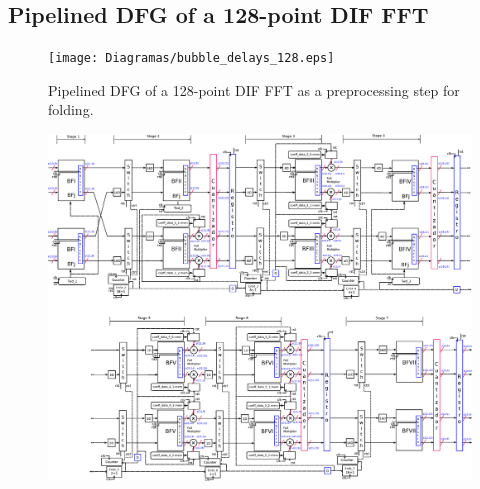 \documentclass[a4paper, 10pt, conference]{ieeeconf}
\begin{document}
\subsection{Pipelined DFG of a 128-point DIF FFT\label{sec:appen:pipe_dfg_128}}

\begin{figure}[htbp]
\centering
 \texttt{[image: Diagramas/bubble\_delays\_128.eps]}%
\caption{Pipelined DFG of a 128-point DIF FFT as a preprocessing step for folding.}
\label{fig:pipe_dfg_128}
\end{figure}



\begin{figure}[ht!]
\centering
 \includegraphics[width=\linewidth]{Diagramas/V5_esquema_p.eps} \\ %

\end{figure}



\end{document}
